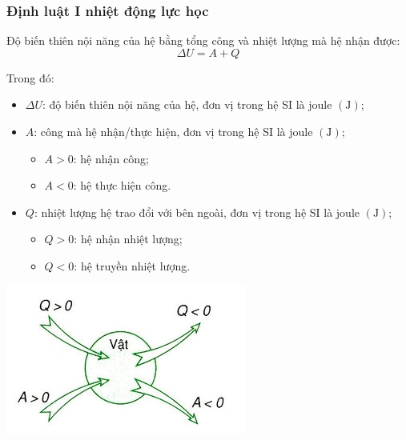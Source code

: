 \begin{tomtat}
\subsubsection{Định luật I nhiệt động lực học}
\begin{dl}
	Độ biến thiên nội năng của hệ bằng tổng công và nhiệt lượng mà hệ nhận được:
	\begin{equation}
		\Delta U= A+Q
	\end{equation}
\end{dl}
Trong đó:
\begin{itemize}
	\item $\Delta U$: độ biến thiên nội năng của hệ, đơn vị trong hệ SI là joule $\left(\si{\joule}\right)$;
	\item $A$: công mà hệ nhận/thực hiện, đơn vị trong hệ SI là joule $\left(\si{\joule}\right)$;
	\begin{itemize}[label=+]
		\item $A>0$: hệ nhận công;
		\item $A<0$: hệ thực hiện công.
	\end{itemize}
	\item $Q$: nhiệt lượng hệ trao đổi với bên ngoài, đơn vị trong hệ SI là joule $\left(\si{\joule}\right)$;
	\begin{itemize}[label=+]
		\item $Q>0$: hệ nhận nhiệt lượng;
		\item $Q<0$: hệ truyền nhiệt lượng.
	\end{itemize}
\end{itemize}
\begin{center}
	\includegraphics[width=0.35\linewidth]{figs/VN12-Y24-PH-SYL-003-3}
\end{center}
\end{tomtat}
